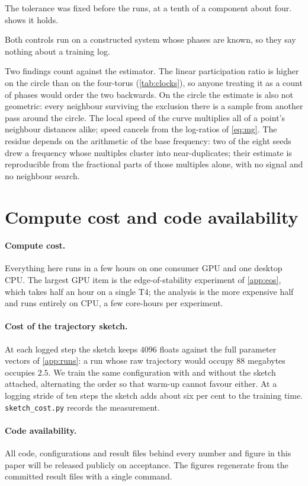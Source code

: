 \documentclass[twoside]{article}
\begin{document}
The tolerance was fixed before the runs, at a tenth of a component about four.
 shows it holds.

Both controls run on a constructed system whose phases are known, so they say nothing about a
training log.

Two findings count against the estimator. The linear participation ratio is higher on the circle
than on the four-torus (\cref{tab:clocks}), so anyone treating it as a count of phases would order
the two backwards. On the circle the estimate is also not geometric: every neighbour surviving the
exclusion there is a sample from another pass around the circle. The local speed of the curve
multiplies all of a point's neighbour distances alike; speed cancels from the log-ratios of
\cref{eq:mg}. The
residue depends on the arithmetic of the base frequency: two of the eight seeds drew a frequency
whose multiples cluster into near-duplicates; their estimate is reproducible from the fractional
parts of those multiples alone, with no signal and no neighbour search.

\section{Compute cost and code availability}\label{app:compute}

\paragraph{Compute cost.} Everything here runs in a few hours on one consumer GPU and one desktop
CPU. The largest GPU item is the edge-of-stability experiment of \cref{app:eos},
which takes half an hour on a single T4; the analysis is the more expensive half and runs entirely
on CPU, a few core-hours per experiment.

\paragraph{Cost of the trajectory sketch.} At each logged step the sketch keeps $4096$ floats
against the full parameter vectors of \cref{app:runs}: a run whose raw trajectory would occupy $88$
megabytes occupies $2.5$. We train the same configuration with and without the sketch attached,
alternating the order so that warm-up cannot favour either. At a logging stride of ten steps the
sketch adds about six per cent to the training time. \texttt{sketch\_cost.py} records the
measurement.

\paragraph{Code availability.} All code, configurations and result files behind every number and
figure in this paper will be released publicly on acceptance. The figures regenerate from the
committed result files with a single command.
\end{document}
